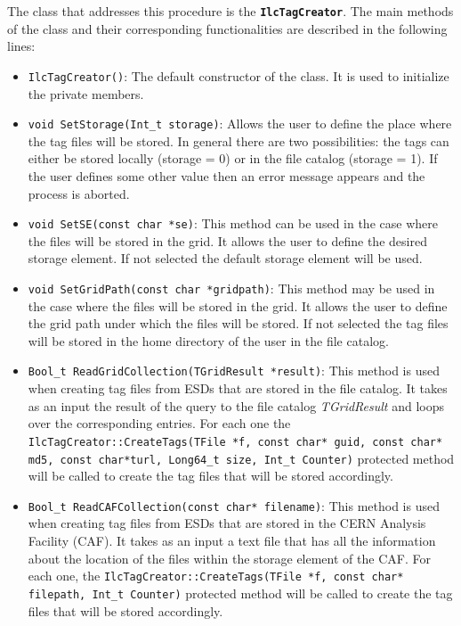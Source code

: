 \documentclass[12pt,a4paper,twoside]{article}
\newcommand{\class}[1]{\texttt{\textbf{#1}}\xspace}
\newcommand{\method}[1]{\texttt{#1}\xspace}
\begin{document}
{The class that addresses this procedure is the \class{IlcTagCreator}. The main methods of the class and their corresponding functionalities are described in the following lines:

\begin{itemize}

\item \method{IlcTagCreator()}: The default constructor of the
  class. It is used to initialize the private members.
\item \method{void SetStorage(Int\_t storage)}: Allows the user to
  define the place where the tag files will be stored. In general
  there are two possibilities: the tags can either be stored locally
  (storage = 0) or in the file catalog (storage = 1). If the user
  defines some other value then an error message appears and the
  process is aborted.

\item \method{void SetSE(const char *se)}: This method can be used in
  the case where the files will be stored in the grid. It allows the
  user to define the desired storage element. If not selected the
  default storage element will be used.

\item \method{void SetGridPath(const char *gridpath)}: This method may
  be used in the case where the files will be stored in the grid. It
  allows the user to define the grid path under which the files will
  be stored. If not selected the tag files will be stored in the home
  directory of the user in the file catalog.

\item \method{Bool\_t ReadGridCollection(TGridResult *result)}: This
  method is used when creating tag files from ESDs that are stored in
  the file catalog. It takes as an input the result of the query to
  the file catalog \textit{TGridResult} and loops over the
  corresponding entries. For each one the
  \method{IlcTagCreator::CreateTags(TFile *f, const char* guid, const char* md5, const char*turl, Long64\_t size, Int\_t Counter)}
  protected method will be called to create the tag files that will be
  stored accordingly.

\item \method{Bool\_t ReadCAFCollection(const char* filename)}: This
  method is used when creating tag files from ESDs that are stored in
  the CERN Analysis Facility (CAF)\cite{CAF}. It takes as an input a
  text file that has all the information about the location of the
  files within the storage element of the CAF. For each one, the
  \method{IlcTagCreator::CreateTags(TFile *f, const char* filepath,
    Int\_t Counter)} protected method will be called to create the tag
  files that will be stored accordingly.


\end{itemize}}
\end{document}
